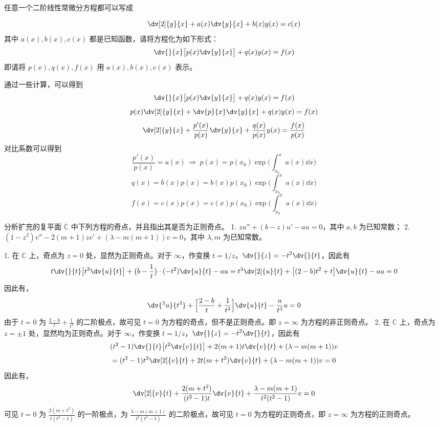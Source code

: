 \begin{question}
任意一个二阶线性常微分方程都可以写成

\[ \dv[2]{y}{x}+a(x)\dv{y}{x}+b(x)y(x)=c(x) \]
其中 \(a(x),b(x),c(x)\) 都是已知函数，请将方程化为如下形式：
\[ \dv{}{x}\bigl[p(x)\dv{y}{x}\bigr] + q(x)y(x)=f(x) \]
即请将 \(p(x),q(x),f(x)\) 用 \(a(x),b(x),c(x)\) 表示。
\begin{solution}
通过一些计算，可以得到
\[ \dv{}{x}\bigl[p(x)\dv{y}{x}\bigr] + q(x)y(x)=f(x) \] \[ p(x)\dv[2]{y}{x}+\dv{p}{x}\dv{y}{x}+q(x)y(x)=f(x) \] \[ \dv[2]{y}{x}+\frac{p'(x)}{p(x)}\dv{y}{x}+\frac{q(x)}{p(x)}y(x)=\frac{f(x)}{p(x)} \]
对比系数可以得到 \[ \frac{p'(x)}{p(x)}=a(x)\ \Rightarrow\ p(x)=p(x_0)\exp\biggl(\int_{x_0}^x a(x)\dd{x}\biggr) \] \[ q(x)=b(x)p(x)=b(x)p(x_0)\exp\biggl(\int_{x_0}^x a(x)\dd{x}\biggr) \] \[ f(x)=c(x)p(x)=c(x)p(x_0)\exp\biggl(\int_{x_0}^x a(x)\dd{x}\biggr) \]
\end{solution}
\end{question}

\begin{question}
分析扩充的复平面 \(\overline{\mathbb{C}}\) 中下列方程的奇点，并且指出其是否为正则奇点。
1. \(z u''+(b-z) u'-a u =0\)，其中 \(a,b\) 为已知常数；
2. \((1-z^2) v''-2(m+1)z v'+(\lambda-m(m+1)) v= 0\)，其中 \(\lambda,m\) 为已知常数。
\begin{solution}
1. 在 \(\mathbb{C}\) 上，奇点为 \(z=0\) 处，显然为正则奇点。对于 \(\infty\)，作变换 \(t=1/z\)，\(\displaystyle\dv{}{z}=-t^2\dv{}{t}\)，因此有 \[ t\dv{}{t}\bigl[t^2\dv{u}{t}\bigr]+\bigl(b-\frac1t\bigr)\cdot(-t^2)\dv{u}{t}-a u =t^3\dv[2]{u}{t} + \bigl[(2-b)t^2+t\bigr]\dv{u}{t}-a u =0 \]因此有，\[ \dv{^3u}{t^3}+\Bigl[\frac{2-b}{t}+\frac1{t^2}\Bigr]\dv{u}{t}-\frac{a}{t^3}u=0 \]由于 \(t=0\) 为 \(\frac{2-b}{t}+\frac1{t^2}\) 的二阶极点，故可见 \(t=0\) 为方程的奇点，但不是正则奇点。即 \(z=\infty\) 为方程的非正则奇点。
2. 在 \(\mathbb{C}\) 上，奇点为 \(z=\pm1\) 处，显然均为正则奇点。对于 \(\infty\)，作变换 \(t=1/z\)，\(\displaystyle\dv{}{z}=-t^2\dv{}{t}\)，因此有 \[ (t^2-1)\dv{}{t}\bigl[t^2\dv{v}{t}\bigr]+2(m+1)t\dv{v}{t}+(\lambda-m(m+1))v \] \[ =(t^2-1)t^2\dv[2]{v}{t}+2t(m+t^2)\dv{v}{t}+(\lambda-m(m+1))v=0 \]因此有，\[ \dv[2]{v}{t}+\frac{2(m+t^2)}{(t^2-1)t}\dv{v}{t}+\frac{\lambda-m(m+1)}{t^2(t^2-1)}v=0 \]可见 \(t=0\) 为 \(\frac{2(m+t^2)}{t(t^2-1)}\) 的一阶极点，为 \(\frac{\lambda-m(m+1)}{t^2(t^2-1)}\) 的二阶极点，故可见 \(t=0\) 为方程的正则奇点，即 \(z=\infty\) 为方程的正则奇点。
\end{solution}
\end{question}

